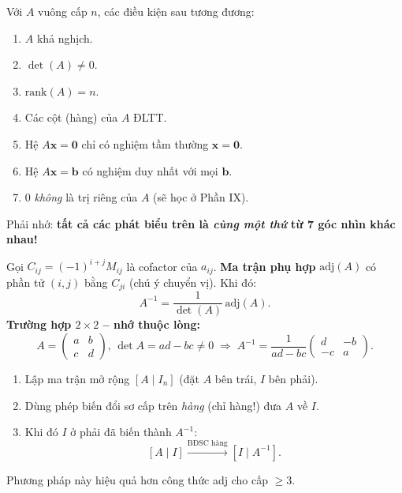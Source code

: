 \documentclass[12pt,a4paper]{article}
\begin{document}
\begin{dinhly}[title={Sáu phát biểu tương đương -- "Đại định lý nghịch đảo"}]
Với $A$ vuông cấp $n$, các điều kiện sau tương đương:
\begin{enumerate}[label=\textbf{(\arabic*)}]
  \item $A$ khả nghịch.
  \item $\det(A) \ne 0$.
  \item $\mathrm{rank}(A) = n$.
  \item Các cột (hàng) của $A$ ĐLTT.
  \item Hệ $A\mathbf{x} = \mathbf{0}$ chỉ có nghiệm tầm thường $\mathbf{x} = \mathbf{0}$.
  \item Hệ $A\mathbf{x} = \mathbf{b}$ có nghiệm duy nhất với mọi $\mathbf{b}$.
  \item $0$ \emph{không} là trị riêng của $A$ (sẽ học ở Phần IX).
\end{enumerate}
Phải nhớ: \textbf{tất cả các phát biểu trên là \emph{cùng một thứ} từ 7 góc nhìn khác nhau!}
\end{dinhly}

\begin{congthuc}[title={Công thức nghịch đảo qua phụ đại số}]
Gọi $C_{ij} = (-1)^{i+j} M_{ij}$ là cofactor của $a_{ij}$. \textbf{Ma trận phụ hợp} $\mathrm{adj}(A)$ có phần tử $(i,j)$ bằng $C_{ji}$ (chú ý chuyển vị). Khi đó:
\[
  A^{-1} = \dfrac{1}{\det(A)}\, \mathrm{adj}(A).
\]
\textbf{Trường hợp $2\times 2$ -- nhớ thuộc lòng:}
\[
  A = \begin{pmatrix}a & b\\ c & d\end{pmatrix},\, \det A = ad - bc \ne 0 \;\Longrightarrow\; A^{-1} = \dfrac{1}{ad - bc}\begin{pmatrix}d & -b\\ -c & a\end{pmatrix}.
\]
\end{congthuc}

\begin{phuongphap}[title={Nghịch đảo bằng Gauss-Jordan -- Cách thực hành}]
\begin{enumerate}
  \item Lập ma trận mở rộng $[A \mid I_n]$ (đặt $A$ bên trái, $I$ bên phải).
  \item Dùng phép biến đổi sơ cấp trên \emph{hàng} (chỉ hàng!) đưa $A$ về $I$.
  \item Khi đó $I$ ở phải đã biến thành $A^{-1}$:
  \[
    [A \mid I] \xrightarrow{\text{BĐSC hàng}} [I \mid A^{-1}].
  \]
\end{enumerate}
Phương pháp này hiệu quả hơn công thức adj cho cấp $\ge 3$.
\end{phuongphap}
\end{document}

